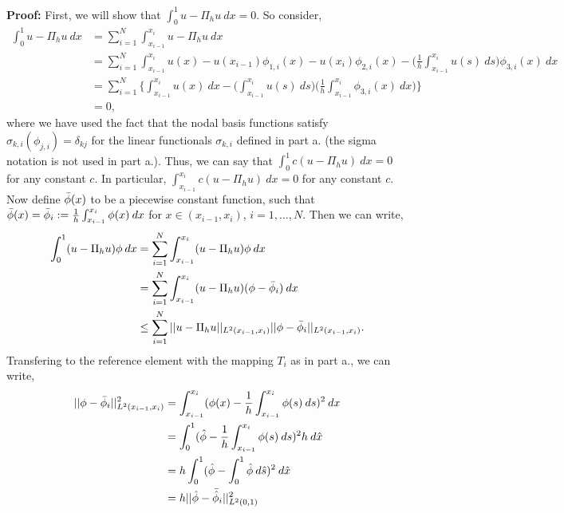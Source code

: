 \documentclass[11pt]{article}
\begin{document}
\vskip 1cm


\textbf{Proof:} First, we will show that $\int_0^1 u - \Pi_h u \: dx = 0$.
So consider,
\begin{align*}
    \int_0^1 u - \Pi_h u \: dx &= \sum_{i=1}^N \int_{x_{i-1}}^{x_i} u - \Pi_h u \: dx \\
    &= \sum_{i=1}^N \int_{x_{i-1}}^{x_i} u(x) - u(x_{i-1})\phi_{1,i}(x) - u(x_i)\phi_{2,i}(x) - \big( \frac{1}{h} \int_{x_{i-1}}^{x_i} u(s) \: ds \Big)  \phi_{3,i}(x) \: dx \\
    &= \sum_{i=1}^N \Big\{ \int_{x_{i-1}}^{x_i} u(x) \: dx - \Big( \int_{x_{i-1}}^{x_i} u(s) \: ds \Big) \Big( \frac{1}{h} \int_{x_{i-1}}^{x_i} \phi_{3,i}(x) \: dx \Big) \Big\} \\
    &= 0,
\end{align*}
where we have used the fact that the nodal basis functions satisfy $\sigma_{k,i}(\phi_{j,i}) = \delta_{kj}$ for the linear functionals $\sigma_{k,i}$ defined in part a. (the sigma notation is not used in part a.).
Thus, we can say that $\int_0^1 c (u - \Pi_h u) \: dx = 0$ for any constant $c$.
In particular, $\int_{x_{i-1}}^{x_i} c(u - \Pi_h u) \: dx = 0$ for any constant $c$.
Now define $\Bar{\phi}(x)$ to be a piecewise constant function, such that  $\Bar{\phi}(x) = \Bar{\phi}_i := \frac{1}{h} \int_{x_{i-1}}^{x_i} \phi(x) \: dx$ for $x \in (x_{i-1}, x_i)$, $i = 1, \ldots, N$.
Then we can write,
\begin{align*}
    \int_0^1 (u - \Pi_h u) \phi \: dx &= \sum_{i=1}^N \int_{x_{i-1}}^{x_i} (u - \Pi_h u) \phi \: dx \\
    &= \sum_{i=1}^N \int_{x_{i-1}}^{x_i} (u - \Pi_h u) (\phi - \Bar{\phi}_i) \: dx \\
    &\leq \sum_{i=1}^N ||u - \Pi_h u||_{L^2(x_{i-1}, x_i)} ||\phi - \Bar{\phi}_i ||_{L^2(x_{i-1}, x_i)}.
\end{align*}
Transfering to the reference element with the mapping $T_i$ as in part a., we can write,
\begin{align*}
    ||\phi - \Bar{\phi}_i||^2_{L^2(x_{i-1}, x_i)} &= \int_{x_{i-1}}^{x_i} (\phi(x) - \frac{1}{h}\int_{x_{i-1}}^{x_i} \phi(s) \: ds )^2 \: dx \\ 
    &= \int_0^1 (\Hat{\phi} - \frac{1}{h}\int_{x_{i-1}}^{x_i} \phi(s) \: ds )^2 h \: d\Hat{x} \\
    &= h \int_0^1 ( \Hat{\phi} - \int_0^1 \Hat{\phi} \: d\Hat{s} )^2 \: d\Hat{x} \\
    &= h ||\Hat{\phi} - \Bar{\Hat{\phi}}_i||^2_{L^2(0,1)}
\end{align*}
\end{document}
